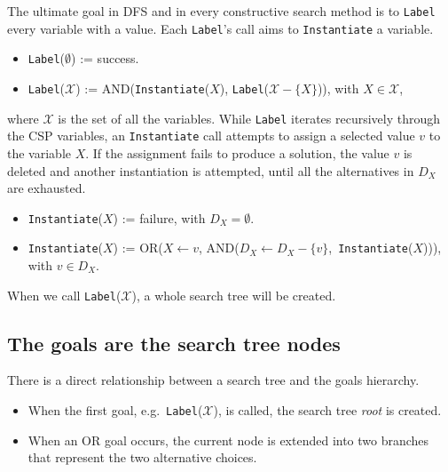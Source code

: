 \documentclass{ws-ijait}
\begin{document}
The ultimate goal in DFS and in every constructive search
method is to \texttt{Label} every variable with a value.
Each \texttt{Label}'s call aims to \texttt{Instantiate} a
variable.
\begin{itemize}
  \item \texttt{Label}($\emptyset$) := \textsf{success}.
  \item \texttt{Label}($\mathscr{X}$) :=
          \textsf{AND}(\texttt{Instantiate}($X$),
            \texttt{Label}($\mathscr{X} \! - \! \{X\}$)),
        with $X \in \mathscr{X}$,
\end{itemize}
where $\mathscr{X}$ is the set of all the variables. While
\texttt{Label} iterates recursively through the CSP
variables, an \texttt{Instantiate} call attempts to assign a
selected value $v$ to the variable $X$. If the assignment
fails to produce a solution, the value $v$ is deleted and
another instantiation is attempted, until all the
alternatives in $D_X$ are exhausted.
\begin{itemize}
  \item \texttt{Instantiate}($X$) := \textsf{failure},
          with $D_X = \emptyset$.
  \item \texttt{Instantiate}($X$) :=
          \textsf{OR}($X \! \gets \! v$,
            \textsf{AND}($D_X \!\! \gets \!\!
            D_X \!\! - \!\! \{v\}$,\,
            \texttt{Instantiate}($X$))), with $v \in D_X$.
\end{itemize}
When we call \texttt{Label}($\mathscr{X}$), a whole search
tree will be created.

\subsection{The goals are the search tree nodes}

There is a direct relationship between a search tree and the
goals hierarchy.
\begin{itemize}
  \item When the first goal, e.g.\ 
        \texttt{Label}($\mathscr{X}$), is called, the search
        tree \emph{root} is created.
  \item When an \textsf{OR} goal occurs, the current node is
        extended into two branches that represent the two
        alternative choices.
\end{itemize}
\end{document}

